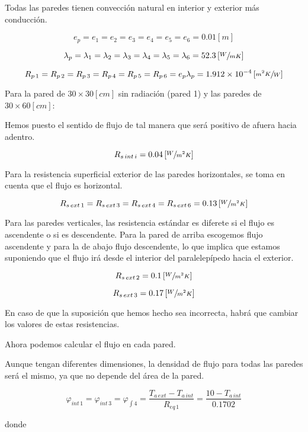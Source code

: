 \documentclass[12pt]{article}
\begin{document}
Todas las paredes tienen convección natural en interior y exterior más conducción.

\[ e_p = e_1 = e_2 = e_3 = e_4 = e_5 = e_6 = 0.01 \left[ m \right] \]

\[ \lambda _p = \lambda _1 = \lambda _2 = \lambda _3 = \lambda _4 = \lambda _5 = \lambda _6 = 52.3 \left[ \sfrac{ W }{ m K } \right] \]

\[ R_{ p \, 1 } = R_{ p \, 2 } = R_{ p \, 3 } = R_{ p \, 4 } = R_{ p \, 5 } = R_{ p \, 6 } = e_p \lambda _p = 1.912 \times 10 ^{ -4 } \left[ \sfrac{ m ^2 K }{ W } \right] \]

Para la pared de $ 30 \times 30 \left[ cm \right] $ sin radiación (pared 1) y las paredes de $ 30 \times 60 \left[ cm \right] $: 

Hemos puesto el sentido de flujo de tal manera que será positivo de afuera hacia adentro.

\[ R_{ s \, int \, i } = 0.04 \left[ \sfrac{ W }{ m ^2 K } \right] \]

Para la resistencia superficial exterior de las paredes horizontales, se toma en cuenta que el flujo es horizontal.

\[ R_{ s \, ext \, 1 } = R_{ s \, ext \, 3 } = R_{ s \, ext \, 4 } = R_{ s \, ext \, 6 } = 0.13 \left[ \sfrac{ W }{ m ^2 K } \right] \]

Para las paredes verticales, las resistencia estándar es diferete si el flujo es ascendente o si es descendente. Para la pared de arriba escogemos flujo ascendente y para la de abajo flujo descendente, lo que implica que estamos suponiendo que el flujo irá desde el interior del paralelepípedo hacia el exterior.

\[ R_{ s \, ext \, 2 } = 0.1 \left[ \sfrac{ W }{ m^2 K } \right] \]

\[ R_{ s \, ext \, 3 } = 0.17 \left[ \sfrac{ W }{ m^2 K } \right] \]

En caso de que la suposición que hemos hecho sea incorrecta, habrá que cambiar los valores de estas resistencias.

Ahora podemos calcular el flujo en cada pared.

Aunque tengan diferentes dimensiones, la densidad de flujo para todas las paredes será el mismo, ya que no depende del área de la pared.

\[ \varphi _{ int \, 1 } = \varphi _{ int \, 3 } = \varphi _{ \int 4 } = \frac{ T_{ a \, ext } - T_{ a \, int } }{ R_{ eq \, 1 } } = \frac{ 10 - T_{ a \, int } }{ 0.1702 } \]

donde
\end{document}
